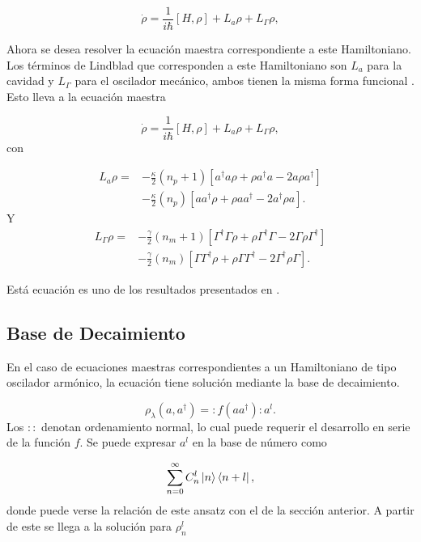 \documentclass[10pt,a4paper]{report}
\begin{document}
\begin{equation}\label{LCMasterEq}
\dot{\rho} = \frac{1}{i\hbar}[H,\rho] +L_a\rho + L_\Gamma \rho,
\end{equation} 

Ahora se desea resolver la ecuación maestra correspondiente a este Hamiltoniano. Los términos de Lindblad que corresponden a este Hamiltoniano son $L_a$ para la cavidad y $L_\Gamma$ para el oscilador mecánico, ambos tienen la misma forma funcional \cite{ZollerQN}. Esto lleva a la ecuación maestra

\begin{equation}\label{LCMasterEquation}
\dot{\rho} = \frac{1}{i\hbar}[H,\rho] + L_a\rho + L_\Gamma \rho,
\end{equation} con

\begin{align}
L_a \rho =& - \frac{\kappa}{2}(n_p + 1)[a^\dagger a\rho + \rho a^\dagger a -2a\rho a^\dagger]  \\
 &- \frac{\kappa}{2}(n_p)[ aa^\dagger\rho + \rho  aa^\dagger -2a^\dagger\rho a].\nonumber
\end{align}
 Y 
\begin{align}
L_\Gamma \rho =& - \frac{\gamma}{2}(n_m + 1)[\Gamma^\dagger \Gamma\rho + \rho \Gamma^\dagger \Gamma -2\Gamma\rho \Gamma^\dagger]  \\
 &- \frac{\gamma}{2}(n_m)[ \Gamma\Gamma^\dagger\rho + \rho  \Gamma\Gamma^\dagger -2\Gamma^\dagger\rho \Gamma].\nonumber
\end{align} 

Está ecuación es uno de los resultados presentados en \cite{YanesOC}.

\subsection{Base de Decaimiento}

En el caso de ecuaciones maestras correspondientes a un Hamiltoniano de tipo oscilador armónico, la ecuación tiene solución mediante la base de decaimiento\cite{EnglertDB}.

\begin{equation}\label{Englert1993}
\rho_\lambda (a,a^\dagger) = :f(aa^\dagger):a^l.
\end{equation} Los $::$ denotan ordenamiento normal, lo cual puede requerir el desarrollo en serie de la función $f$. Se puede expresar $a^l$ en la base de número como

\begin{equation}
\sum_{n=0}^\infty C_n^l\Ket{n}\Bra{n+l},
\end{equation} donde puede verse la relación de este ansatz con el de la sección anterior. A partir de este se llega a la solución para $\rho_n^l$ \cite{EnglertDB}
\end{document}
